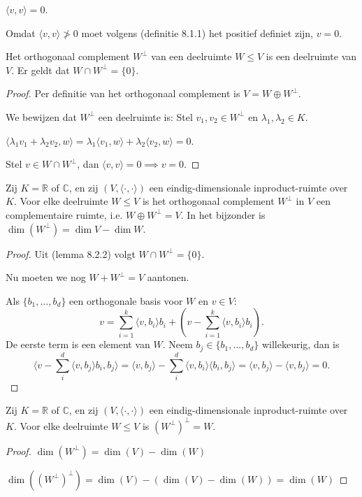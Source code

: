 \(\langle v, v \rangle = 0\).

Omdat \(\langle v, v \rangle \ngtr 0\) moet volgens (definitie 8.1.1) het positief definiet zijn, \(v=0\).


\begin{lemma}[8.2.2]
    Het orthogonaal complement $W^\perp$ van een deelruimte $W \le V$ is een deelruimte van $V$. Er geldt dat $W \cap W^\perp = \{0\}$.
\end{lemma}
\begin{proof}
    Per definitie van het orthogonaal complement is \(V = W \oplus W^\perp\).

    We bewijzen dat \(W^\perp\) een deelruimte is:
    Stel \(v_1,v_2 \in W^\perp\) en \(\lambda_1, \lambda_2 \in K\).

    \(\langle \lambda_1 v_1 + \lambda_2 v_2,w\rangle = \lambda_1 \langle  v_1  ,w\rangle + \lambda_2  \langle v_2,w\rangle = 0\).

    Stel \(v \in W \cap W^\perp\), dan \(\langle v,v \rangle = 0 \implies v = 0. \)
\end{proof}

\begin{lemma}[8.2.5]
    Zij $K = \mathbb{R}$ of $\mathbb{C}$, en zij $(V, \langle \cdot, \cdot \rangle)$ een eindig-dimensionale inproduct-ruimte over $K$. Voor elke deelruimte $W \le V$ is het orthogonaal complement $W^\perp$ in $V$ een complementaire ruimte,
    i.e. $W \oplus W^\perp = V$.
    In het bijzonder is $\dim(W^\perp) = \dim V - \dim W$.
\end{lemma}
\begin{proof}
    Uit (lemma 8.2.2) volgt  \(W \cap W^\perp = \{0\}\).

    Nu moeten we nog \(W + W^\perp = V\) aantonen.

    Als \(\{b_1, \dots, b_d\}\) een orthogonale basis voor \(W\) en \(v\in V\):
     \[v=\sum_{i=1}^{k} \langle v,b_i\rangle b_i + \left(v - \sum_{i=1}^{k} \langle v,b_i\rangle b_i \right).\]
    De eerste term is een element van \(W\).
    Neem \(b_j \in \{b_1,\dots,b_d\}\) willekeurig, dan is
    \[
    \langle v - \sum_{i}^{d} \langle v,b_j \rangle b_i, b_j \rangle
    = \langle v,b_j\rangle - \sum_{i}^{d} \langle v,b_i \rangle \langle b_i,b_j \rangle
    = \langle v,b_j \rangle - \langle v,b_j \rangle = 0.
    \]
\end{proof}

\begin{gevolg}[8.2.6]
    Zij $K = \mathbb{R}$ of $\mathbb{C}$, en zij $(V, \langle \cdot, \cdot \rangle)$ een eindig-dimensionale inproduct-ruimte over $K$. Voor elke deelruimte $W \le V$ is $(W^\perp)^\perp = W$.
\end{gevolg}
\begin{proof}
    \(\dim (W^\perp) = \dim(V)-\dim(W) \)

    \(\dim((W^\perp)^\perp) = \dim(V) -(\dim(V)-\dim(W)) = \dim(W)\)
\end{proof}

